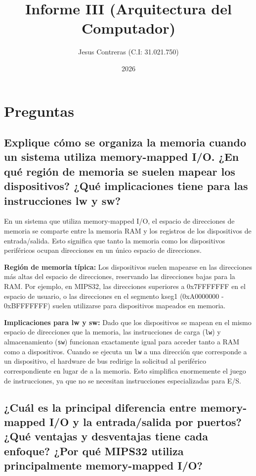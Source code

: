 \documentclass[12pt]{article}
\title{Informe III (Arquitectura del Computador)}
\author{Jesus Contreras (C.I: 31.021.750)}
\date{2026}
\begin{document}
	
	\maketitle
	
	\section{Preguntas}
	
	\subsection{Explique cómo se organiza la memoria cuando un sistema utiliza memory-mapped I/O. ¿En qué región de memoria se suelen mapear los dispositivos? ¿Qué implicaciones tiene para las instrucciones lw y sw?}
	
	En un sistema que utiliza memory-mapped I/O, el espacio de direcciones de memoria se comparte entre la memoria RAM y los registros de los dispositivos de entrada/salida. Esto significa que tanto la memoria como los dispositivos periféricos ocupan direcciones en un único espacio de direcciones.
	
	\textbf{Región de memoria típica:} Los dispositivos suelen mapearse en las direcciones más altas del espacio de direcciones, reservando las direcciones bajas para la RAM. Por ejemplo, en MIPS32, las direcciones superiores a 0x7FFFFFFF en el espacio de usuario, o las direcciones en el segmento kseg1 (0xA0000000 - 0xBFFFFFFF) suelen utilizarse para dispositivos mapeados en memoria.
	
	\textbf{Implicaciones para lw y sw:} Dado que los dispositivos se mapean en el mismo espacio de direcciones que la memoria, las instrucciones de carga (\texttt{lw}) y almacenamiento (\texttt{sw}) funcionan exactamente igual para acceder tanto a RAM como a dispositivos. Cuando se ejecuta un \texttt{lw} a una dirección que corresponde a un dispositivo, el hardware de bus redirige la solicitud al periférico correspondiente en lugar de a la memoria. Esto simplifica enormemente el juego de instrucciones, ya que no se necesitan instrucciones especializadas para E/S.
	
	\subsection{¿Cuál es la principal diferencia entre memory-mapped I/O y la entrada/salida por puertos? ¿Qué ventajas y desventajas tiene cada enfoque? ¿Por qué MIPS32 utiliza principalmente memory-mapped I/O?}
	
\end{document}
